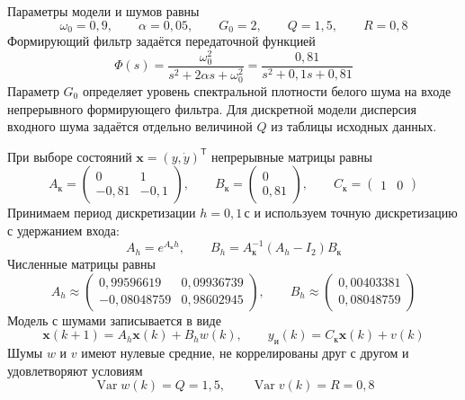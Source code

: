 Параметры модели и шумов равны
\begin{equation}
  \omega_0=0{,}9,\qquad \alpha=0{,}05,\qquad G_0=2,
  \qquad Q=1{,}5,\qquad R=0{,}8
  \label{eq:pitching-data}
\end{equation}
Формирующий фильтр задаётся передаточной функцией
\begin{equation}
  \Phi(s)=\frac{\omega_0^2}{s^2+2\alpha s+\omega_0^2}
    =\frac{0{,}81}{s^2+0{,}1s+0{,}81}
  \label{eq:pitching-transfer}
\end{equation}
Параметр $G_0$ определяет уровень спектральной плотности белого шума
на входе непрерывного формирующего фильтра.
Для дискретной модели дисперсия входного шума задаётся отдельно
величиной $Q$ из таблицы исходных данных.

При выборе состояний $\bm x=(y,\dot y)^{\mathsf T}$ непрерывные матрицы равны
\begin{equation}
  A_{\text{к}}=\begin{pmatrix}0&1\\-0{,}81&-0{,}1\end{pmatrix},
  \qquad
  B_{\text{к}}=\begin{pmatrix}0\\0{,}81\end{pmatrix},
  \qquad C_{\text{к}}=\begin{pmatrix}1&0\end{pmatrix}
  \label{eq:pitching-continuous-matrices}
\end{equation}
Принимаем период дискретизации $h=0{,}1\,\text{с}$ и используем
точную дискретизацию с удержанием входа:
\begin{equation}
  A_h=e^{A_{\text{к}}h},
  \qquad
  B_h=A_{\text{к}}^{-1}(A_h-I_2)B_{\text{к}}
  \label{eq:pitching-discretization}
\end{equation}
Численные матрицы равны
\begin{equation}
  A_h\approx\begin{pmatrix}
    0{,}99596619&0{,}09936739\\
    -0{,}08048759&0{,}98602945
  \end{pmatrix},
  \qquad
  B_h\approx\begin{pmatrix}0{,}00403381\\0{,}08048759\end{pmatrix}
  \label{eq:pitching-discrete-matrices}
\end{equation}
Модель с шумами записывается в виде
\begin{equation}
  \bm x(k+1)=A_h\bm x(k)+B_hw(k),
  \qquad y_{\text{и}}(k)=C_{\text{к}}\bm x(k)+v(k)
  \label{eq:pitching-discrete-model}
\end{equation}
Шумы $w$ и $v$ имеют нулевые средние, не коррелированы друг с другом
и удовлетворяют условиям
\begin{equation}
  \operatorname{Var}w(k)=Q=1{,}5,
  \qquad \operatorname{Var}v(k)=R=0{,}8
  \label{eq:pitching-noise-variance}
\end{equation}

